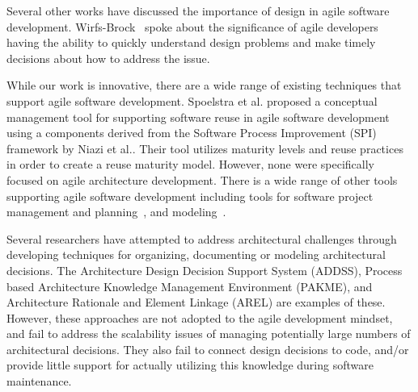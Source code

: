 
Several other works have discussed the importance of design in agile software development. Wirfs-Brock~\cite{Wirfs-Brock:2010:SAD:1869542.1869630} spoke about the significance of agile developers having the ability to quickly understand design problems and make timely decisions about how to address the issue. 

While our work is innovative, there are a wide range of existing techniques that support agile software development. Spoelstra et al.\cite{Spoelstra:2011:SRA:1982185.1982255} proposed a conceptual management tool for supporting software reuse in agile software development using a components derived from the Software Process Improvement (SPI) framework by Niazi et al.\cite{Niazi:2005:MMI:1045926.1045932}. Their tool utilizes maturity levels and reuse practices in order to create a reuse maturity model. However, none were specifically focused on agile architecture development. There is a wide range of other tools supporting agile software development including tools for software project management and planning~\cite{Petersen:2008:APT:1379092.1379101, Dhlamini:2009:IRM:1562741.1562745}, and modeling~\cite{Buchmann:2012:TTS:2467307.2467310}. 

Several researchers have attempted to address architectural challenges through developing techniques for organizing, documenting or modeling architectural decisions. The Architecture Design Decision Support System (ADDSS)\cite{ADDSS}, Process based Architecture Knowledge Management Environment (PAKME)\cite{PAKME}, and Architecture Rationale and Element Linkage (AREL)\cite{AREL} are examples of these. However, these approaches are not adopted to the agile development mindset, and fail to address the scalability issues of managing potentially large numbers of architectural decisions.  They also fail to connect design decisions to code, and/or provide little support for actually utilizing this knowledge during software maintenance. 

